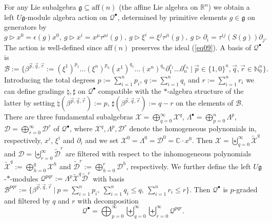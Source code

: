 \documentclass[a4paper,11pt]{article}
\begin{document}
For any Lie subalgebra $\mathfrak{g}\subseteq\mathrm{aff}(n)$ (the affine Lie algebra on  $\mathbb{R}^n$)  we obtain a left
$U\mathfrak{g}$-module algebra action on $\mathcal{Q}^\bullet$, determined
by primitive elements $g\in\mathfrak{g}$ on generators by
\begin{equation}
    g\rhd x^0=\epsilon(g)x^0,~
    g\rhd x^i=x^\mu\tau^{\mu i}(g),~
    g\rhd\xi^i=\xi^j\tau^{ji}(g),~
    g\rhd\partial_i=\tau^{ij}(S(g))\partial_j.
\end{equation}
The action is well-defined since $\mathrm{aff}(n)$ preserves the ideal (\ref{eq09}).
A basis of $\mathcal{Q}^\bullet$ is
\begin{equation}
    \mathcal{B}:=\{\beta^{\vec{p},\vec{q},\vec{r}}
    :=(\xi^1)^{p_1}\ldots(\xi^n)^{p_n}(x^1)^{q_1}\ldots(x^n)^{q_n}
    \partial_1^{r_1}\ldots\partial_n^{r_n}~|~
    \vec{p}\in\{1,0\}^n,\vec{q},\vec{r}\in\mathbb{N}_0^n\}.
\end{equation}
Introducing the total degrees
$p:=\sum_{i=1}^np_i$, $q:=\sum_{i=1}^nq_i$ and $r:=\sum_{i=1}^nr_i$ we can define 
gradings $\natural,\sharp$ on $\mathcal{Q}^\bullet$ compatible with the $*$-algebra structure of the latter
by setting $\natural(\beta^{\vec{p},\vec{q},\vec{r}}):=p$, $\sharp(\beta^{\vec{p},\vec{q},\vec{r}}):=q-r$
on the elements of $\mathcal{B}$.
There are three fundamental subalgebras
$\mathcal{X}=\bigoplus_{q=0}^\infty\mathcal{X}^q$, 
$\Lambda^\bullet%
=\bigoplus_{p=0}^n\Lambda^p$, 
$\mathcal{D}=\bigoplus_{r=0}^\infty\mathcal{D}^r$ 
of $\mathcal{Q}^\bullet$, where $\mathcal{X}^q,\Lambda^p,\mathcal{D}^r$ denote
the homogeneous polynomials in, respectively, $x^i$, $\xi^i$ and $\partial_i$
and we set $\mathcal{X}^0=\Lambda^0=\mathcal{D}^0=\mathbb{C}\cdot x^0$.
Then $\mathcal{X}=\biguplus_{q=0}^\infty\tilde{\mathcal{X}}^q$ and
$\mathcal{D}=\biguplus_{r=0}^\infty\tilde{\mathcal{D}}^r$
are filtered with respect to the inhomogeneous polynomials 
$\tilde{\mathcal{X}}^q:=\bigoplus_{h=0}^q\mathcal{X}^h$
and $\tilde{\mathcal{D}}^r:=\bigoplus_{h=0}^r\mathcal{D}^h$, respectively.
We further define the left 
$U\mathfrak{g}$-$*$-modules $\mathcal{Q}^{pqr}:=\Lambda^p\tilde{\mathcal{X}}^q
\tilde{\mathcal{D}}^r$ with basis
$\mathcal{B}^{pqr}:=\{\beta^{\vec{p},\vec{q},\vec{r}}~|~p=\sum_{i=1}^np_i,~
\sum_{i=1}^nq_i\leq q,~\sum_{i=1}^nr_i\leq r\}$.
Then $\mathcal{Q}^\bullet$ is $p$-graded and filtered by $q$ and $r$ with decomposition
\begin{equation}
    \mathcal{Q}^\bullet=\bigoplus_{p=0}^\infty\biguplus_{q=0}^\infty
    \biguplus_{r=0}^\infty\mathcal{Q}^{pqr}.
\end{equation}
\end{document}
